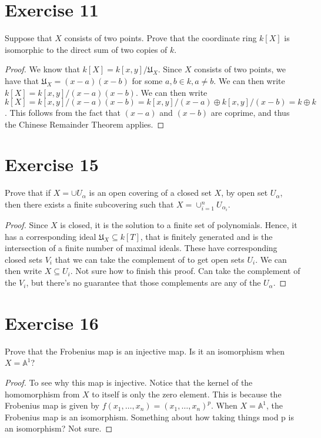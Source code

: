\documentclass[12pt]{article}
\begin{document}
\section*{Exercise 11}

Suppose that $X$ consists of two points. Prove that the coordinate ring $k[X]$ is isomorphic to the
direct sum of two copies of $k$.

\begin{proof}

  We know that $k[X] = k[x,y] / \mathfrak{U}_X$. Since $X$ consists of two points, we have that
  $\mathfrak{U}_X = (x-a)(x-b)$ for some $a,b \in k, a \neq b$. We can then write $k[X] = k[x,y] / (x-a)(x-b)$.
  We can then write $k[X] = k[x,y] / (x-a)(x-b) = k[x,y] / (x-a) \oplus k[x,y] / (x-b) = k \oplus k$. 
  This follows from the fact that $(x-a)$ and $(x-b)$ are coprime, and thus the Chinese Remainder Theorem applies.

\end{proof}

\section*{Exercise 15}

Prove that if $X = \cup U_\alpha$ is an open covering of a closed set $X$, by open set $U_\alpha$,
then there exists a finite subcovering such that $X = \cup_{i=1}^{n} U_{\alpha_i}$.

\begin{proof}

  Since $X$ is closed, it is the solution to a finite set of polynomials. Hence, it has a
  corresponding ideal $\mathfrak{U}_X \subseteq k[T]$, that is finitely generated and is the
  intersection of a finite number of maximal ideals. These have corresponding closed sets $V_i$ that
  we can take the complement of to get open sets $U_i$. We can then write $X \subseteq U_i$. Not
  sure how to finish this proof. Can take the complement of the $V_i$, but there's no guarantee that
  those complements are any of the $U_\alpha$. 

\end{proof}


\section*{Exercise 16}

Prove that the Frobenius map is an injective map. Is it an isomorphism when $ X = \mathbb{A}^1$?

\begin{proof}

  To see why this map is injective. Notice that the kernel of the homomorphism from $X$ to itself is
  only the zero element. This is because the Frobenius map is given by $f(x_1, \ldots , x_n) = (x_1,
  \ldots, x_n)^p$. When $X = \mathbb{A}^1$, the Frobenius map is an isomorphism. Something about how
  taking things mod p is an isomorphism? Not sure.



  \end{proof}
\end{document}
